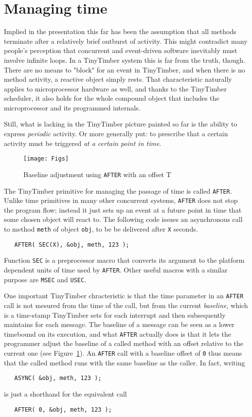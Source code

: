 \documentclass[12pt]{article}
\begin{document}
\section{Managing time}
\label{sect:time}

Implied in the presentation this far has been the assumption that all methods terminate after a relatively brief outburst of activity.  This might contradict many people's perception that concurrent and event-driven software inevitably must involve infinite loops.  In a TinyTimber system this is far from the truth, though.  There are no means to "block" for an event in TinyTimber, and when there is no method activity, a reactive object simply rests.  That characteristic naturally applies to microprocessor hardware as well, and thanks to the TinyTimber scheduler, it also holds for the whole compound object that includes the microprocessor and its programmed internals.

Still, what is lacking in the TinyTimber picture painted so far is the ability to express {\em periodic} activity.  Or more generally put: to prescribe that a certain activity must be triggered {\em at a certain point in time}.

\begin{figure}
\texttt{[image: Figs]}
\caption{\label{fig:after}Baseline adjustment using {\tt AFTER} with an offset T}
\end{figure}

The TinyTimber primitive for managing the passage of time is called {\tt AFTER}.  Unlike time primitives in many other concurrent systems, {\tt AFTER} does not stop the program flow; instead it just sets up an event at a future point in time that some chosen object will react to.  The following code issues an asynchronous call to method {\tt meth} of object {\tt obj}, to be be delivered after {\tt X} seconds.
\begin{verbatim}
   AFTER( SEC(X), &obj, meth, 123 );
\end{verbatim}
Function {\tt SEC} is a preprocessor macro that converts its argument to the platform dependent units of time used by {\tt AFTER}.  Other useful macros with a similar purpose are {\tt MSEC} and {\tt USEC}.

One important TinyTimber chracteristic is that the time parameter in an {\tt AFTER} call is not mesured from the time of the call, but from the current {\em baseline}, which is a time-stamp TinyTimber sets for each interrupt and then subsequently maintains for each message.  The baseline of a message can be seen as a lower timebound on its execution, and what {\tt AFTER} actually does is that it lets the programmer adjust the baseline of a called method with an offset relative to the current one (see Figure~\ref{fig:after}). An {\tt AFTER} call with a baseline offset of {\tt 0} thus means that the called method runs with the same baseline as the caller. In fact, writing
\begin{verbatim}
   ASYNC( &obj, meth, 123 );
\end{verbatim}
is just a shorthand for the equivalent call
\begin{verbatim}
   AFTER( 0, &obj, meth, 123 );
\end{verbatim}
\end{document}
